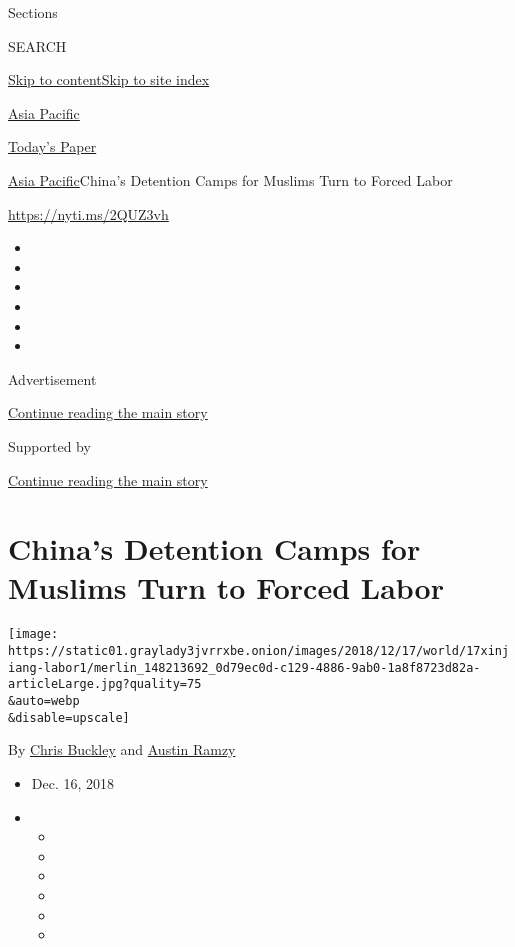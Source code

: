 Sections

SEARCH

\protect\hyperlink{site-content}{Skip to
content}\protect\hyperlink{site-index}{Skip to site index}

\href{https://www.nytimes3xbfgragh.onion/section/world/asia}{Asia
Pacific}

\href{https://myaccount.nytimes3xbfgragh.onion/auth/login?response_type=cookie\&client_id=vi}{}

\href{https://www.nytimes3xbfgragh.onion/section/todayspaper}{Today's
Paper}

\href{/section/world/asia}{Asia Pacific}\textbar{}China's Detention
Camps for Muslims Turn to Forced Labor

\href{https://nyti.ms/2QUZ3vh}{https://nyti.ms/2QUZ3vh}

\begin{itemize}
\item
\item
\item
\item
\item
\item
\end{itemize}

Advertisement

\protect\hyperlink{after-top}{Continue reading the main story}

Supported by

\protect\hyperlink{after-sponsor}{Continue reading the main story}

\hypertarget{chinas-detention-camps-for-muslims-turn-to-forced-labor}{%
\section{China's Detention Camps for Muslims Turn to Forced
Labor}\label{chinas-detention-camps-for-muslims-turn-to-forced-labor}}

\texttt{[image: https://static01.graylady3jvrrxbe.onion/images/2018/12/17/world/17xinjiang-labor1/merlin\_148213692\_0d79ec0d-c129-4886-9ab0-1a8f8723d82a-articleLarge.jpg?quality=75\\\&auto=webp\\\&disable=upscale]}

By \href{https://www.nytimes3xbfgragh.onion/by/chris-buckley}{Chris
Buckley} and
\href{https://www.nytimes3xbfgragh.onion/by/austin-ramzy}{Austin Ramzy}

\begin{itemize}
\item
  Dec. 16, 2018
\item
  \begin{itemize}
  \item
  \item
  \item
  \item
  \item
  \item
  \end{itemize}
\end{itemize}

